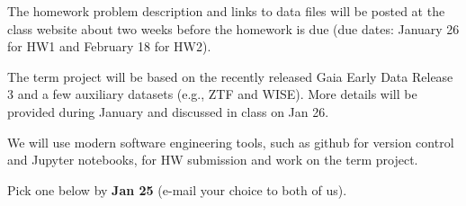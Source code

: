 \documentclass[10pt]{article}
\begin{document}
The homework problem description and links to data files will be posted at the class website 
about two weeks before the homework is due (due dates: January 26 for HW1 and February 18 for HW2).

The term project will be based on the recently released Gaia Early Data Release 3 and a few
auxiliary datasets (e.g., ZTF and WISE). More details will be provided during January and
discussed in class on Jan 26. 

We will use modern software engineering tools, such as github for version control and Jupyter 
notebooks, for HW submission and work on the term project. 

\vskip 0.2in


Pick one below by {\bf Jan 25} (e-mail your choice to both of us).
\end{document}
